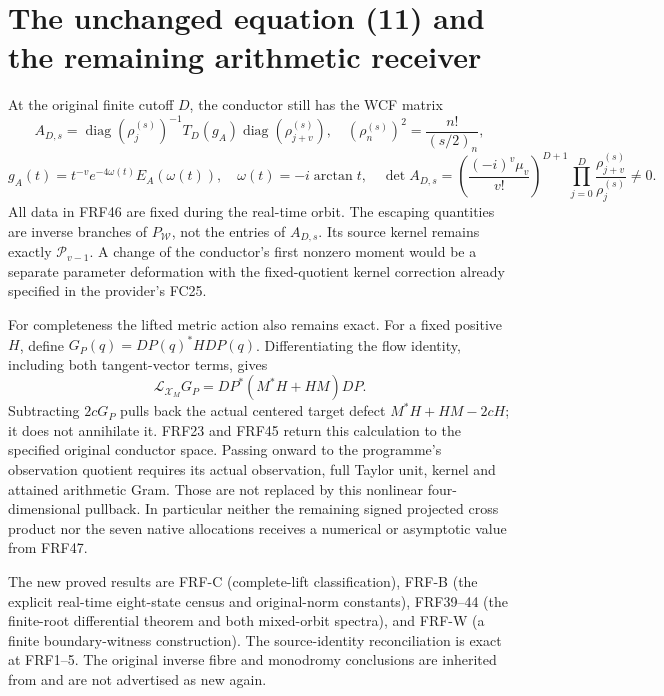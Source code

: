 \documentclass[11pt]{article}
\newcommand{\diag}{\operatorname{diag}}
\begin{document}
\section{The unchanged equation (11) and the remaining arithmetic receiver}
At the original finite cutoff $D$, the conductor still has the WCF matrix
\[
 A_{D,s}=\diag(\rho_j^{(s)})^{-1}T_D(g_A)
              \diag(\rho_{j+v}^{(s)}),\quad
 (\rho_n^{(s)})^2=\frac{n!}{(s/2)_n},\tag{FRF46}
\]
\[
 g_A(t)=t^{-v}e^{-4\omega(t)}E_A(\omega(t)),\quad
 \omega(t)=-i\arctan t,\quad
 \det A_{D,s}=\left(\frac{(-i)^v\mu_v}{v!}\right)^{D+1}
              \prod_{j=0}^D\frac{\rho_{j+v}^{(s)}}{\rho_j^{(s)}}\ne0.
\]
All data in FRF46 are fixed during the real-time orbit. The escaping
quantities are inverse branches of $P_{\mathcal W}$, not the entries
of $A_{D,s}$. Its source kernel remains exactly $\mathcal P_{v-1}$.
A change of the conductor's first nonzero moment would be a separate
parameter deformation with the fixed-quotient kernel correction already
specified in the provider's FC25.

For completeness the lifted metric action also remains exact. For a fixed
positive $H$, define $G_P(q)=DP(q)^*HDP(q)$. Differentiating the flow
identity, including both tangent-vector terms, gives
\[
 \mathcal L_{\mathcal X_M}G_P
       =DP^*(M^*H+HM)DP.\tag{FRF47}
\]
Subtracting $2cG_P$ pulls back the actual centered target defect
$M^*H+HM-2cH$; it does not annihilate it. FRF23 and FRF45 return this
calculation to the specified original conductor space. Passing onward
to the programme's observation quotient requires its actual observation,
full Taylor unit, kernel and attained arithmetic Gram. Those are not
replaced by this nonlinear four-dimensional pullback. In particular
neither the remaining signed projected cross product nor the seven
native allocations receives a numerical or asymptotic value from FRF47.

The new proved results are FRF-C (complete-lift classification), FRF-B
(the explicit real-time eight-state census and original-norm constants),
FRF39--44 (the finite-root differential theorem and both mixed-orbit
spectra), and FRF-W (a finite boundary-witness construction). The
source-identity reconciliation is exact at FRF1--5. The original inverse
fibre and monodromy conclusions are inherited from \cite{Signed} and
are not advertised as new again.
\end{document}
